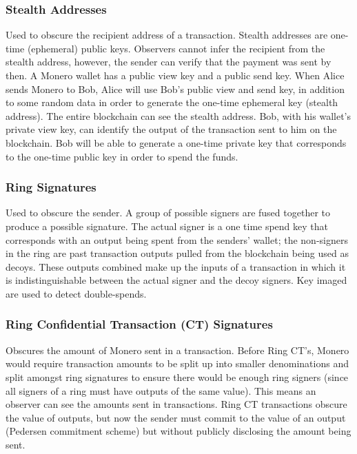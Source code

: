 \subsubsection{Stealth Addresses}
Used to obscure the recipient address of a transaction. Stealth addresses are one-time (ephemeral) public keys. Observers cannot infer the recipient from the stealth address, however, the sender can verify that the payment was sent by then. A Monero wallet has a public view key and a public send key. When Alice sends Monero to Bob, Alice will use Bob's public view and send key, in addition to some random data in order to generate the one-time ephemeral key (stealth address). The entire blockchain can see the stealth address. Bob, with his wallet's private view key, can identify the output of the transaction sent to him on the blockchain. Bob will be able to generate a one-time private key that corresponds to the one-time public key in order to spend the funds. 

\subsubsection{Ring Signatures}
Used to obscure the sender. A group of possible signers are fused together to produce a possible signature. The actual signer is a one time spend key that corresponds with an output being spent from the senders' wallet; the non-signers in the ring are past transaction outputs pulled from the blockchain being used as decoys. These outputs combined make up the inputs of a transaction in which it is indistinguishable between the actual signer and the decoy signers. Key imaged are used to detect double-spends. 

\subsubsection{Ring Confidential Transaction (CT) Signatures}
Obscures the amount of Monero sent in a transaction. 
Before Ring CT's, Monero would require transaction amounts to be split up into smaller denominations and split amongst ring signatures to ensure there would be enough ring signers (since all signers of a ring must have outputs of the same value). This means an observer can see the amounts sent in transactions. Ring CT transactions obscure the value of outputs, but now the sender must commit to the value of an output (Pedersen commitment scheme) but without publicly disclosing the amount being sent. 



